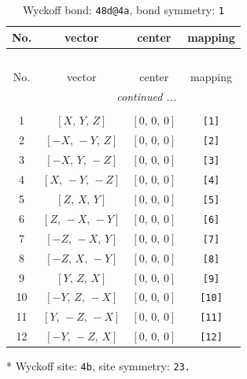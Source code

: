 \documentclass[fleqn,8pt]{jsarticle}
\begin{document}
\renewcommand{\arraystretch}{1.2}
\begin{longtable}{cccc}
\caption{Wyckoff bond: {\tt 48d@4a}, bond symmetry: {\tt 1}}
 \\
 \hline \hline
No. & vector & center & mapping \\ \hline \endfirsthead

\multicolumn{3}{l}{\tablename\ \thetable{}} \\
 \hline \hline
No. & vector & center & mapping \\ \hline \endhead

 \hline \hline
\multicolumn{3}{r}{\footnotesize\it continued ...} \\ \endfoot

 \hline \hline
\multicolumn{3}{r}{} \\ \endlastfoot

1 & $\left[ X,\, Y,\, Z \right]$ & $\left[ 0,\, 0,\, 0 \right]$ & {\tt [1]} \\ \hline
2 & $\left[ - X,\, - Y,\, Z \right]$ & $\left[ 0,\, 0,\, 0 \right]$ & {\tt [2]} \\ \hline
3 & $\left[ - X,\, Y,\, - Z \right]$ & $\left[ 0,\, 0,\, 0 \right]$ & {\tt [3]} \\ \hline
4 & $\left[ X,\, - Y,\, - Z \right]$ & $\left[ 0,\, 0,\, 0 \right]$ & {\tt [4]} \\ \hline
5 & $\left[ Z,\, X,\, Y \right]$ & $\left[ 0,\, 0,\, 0 \right]$ & {\tt [5]} \\ \hline
6 & $\left[ Z,\, - X,\, - Y \right]$ & $\left[ 0,\, 0,\, 0 \right]$ & {\tt [6]} \\ \hline
7 & $\left[ - Z,\, - X,\, Y \right]$ & $\left[ 0,\, 0,\, 0 \right]$ & {\tt [7]} \\ \hline
8 & $\left[ - Z,\, X,\, - Y \right]$ & $\left[ 0,\, 0,\, 0 \right]$ & {\tt [8]} \\ \hline
9 & $\left[ Y,\, Z,\, X \right]$ & $\left[ 0,\, 0,\, 0 \right]$ & {\tt [9]} \\ \hline
10 & $\left[ - Y,\, Z,\, - X \right]$ & $\left[ 0,\, 0,\, 0 \right]$ & {\tt [10]} \\ \hline
11 & $\left[ Y,\, - Z,\, - X \right]$ & $\left[ 0,\, 0,\, 0 \right]$ & {\tt [11]} \\ \hline
12 & $\left[ - Y,\, - Z,\, X \right]$ & $\left[ 0,\, 0,\, 0 \right]$ & {\tt [12]} \\
\end{longtable}
* Wyckoff site: {\tt 4b}, site symmetry: {\tt 23.}
\renewcommand{\arraystretch}{1.2}
\end{document}
